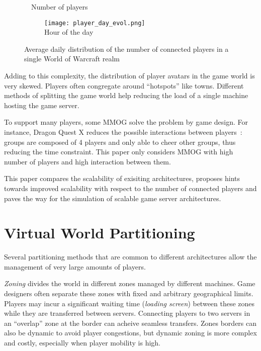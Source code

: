 \documentclass[conference]{IEEEtran}
\begin{document}
\begin{figure}
	\centering
	\begin{sideways}\qquad~~Number of players\end{sideways}
	\begin{subfigure}[b]{7.5cm}
		\centering
		\texttt{[image: player\_day\_evol.png]}\\
		Hour of the day
	\end{subfigure}
	\caption{Average daily distribution of the number of connected players in a single World of Warcraft realm}
	\label{fig:player_day_evol}
\end{figure}


Adding to this complexity, the distribution of player avatars in the game world is very skewed. Players often congregate around ``hotspots'' like towns. Different methods of splitting the game world help reducing the load of a single machine hosting the game server.

To support many players, some MMOG solve the problem by game design. For instance, Dragon Quest X reduces the possible interactions between players~: groups are composed of 4 players and only able to cheer other groups, thus reducing the time constraint. This paper only considers MMOG with high number of players and high interaction between them.

This paper compares the scalability of exisiting architectures, proposes hints towards improved scalability with respect to the number of connected players and paves the way for the simulation of scalable game server architectures.

\section{Virtual World Partitioning}

Several partitioning methods that are common to different architectures allow the management of very large amounts of players.

\textit{Zoning} divides the world in different zones managed by different machines. Game designers often separate these zones with fixed and arbitrary geographical limits. Players may incur a significant waiting time (\textit{loading screen}) between these zones while they are transferred between servers. Connecting players to two servers in an ``overlap'' zone at the border can acheive seamless transfers. Zones borders can also be dynamic to avoid player congestions, but dynamic zoning is more complex and costly, especially when player mobility is high.
\end{document}
